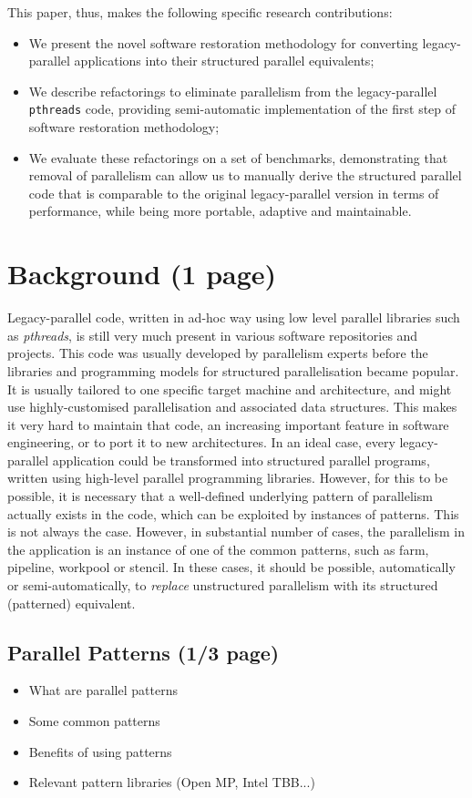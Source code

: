 \documentclass{llncs}
\begin{document}
This paper, thus, makes the following specific research contributions:
\begin{itemize}
    \item We present the novel software restoration methodology for converting legacy-parallel applications into their structured parallel equivalents;
    \item We describe refactorings to eliminate parallelism from the legacy-parallel \lstinline{pthreads} code, providing semi-automatic implementation of the first step of software restoration methodology;
    \item We evaluate these refactorings on a set of benchmarks, demonstrating that removal of parallelism can allow us to manually derive the structured parallel code that is comparable to the original legacy-parallel version in terms of performance, while being more portable, adaptive and maintainable.
\end{itemize}

\section{Background (1 page)}
Legacy-parallel code, written in ad-hoc way using low level parallel libraries such as \emph{pthreads}, is still very much present in various software repositories and projects. This code was usually developed by parallelism experts before the libraries and programming models for structured parallelisation became popular. It is usually tailored to one specific target machine and architecture, and might use highly-customised parallelisation and associated data structures. This makes it very hard to maintain that code, an increasing important feature in software engineering, or to port it to new architectures. In an ideal case, every legacy-parallel application could be transformed into structured parallel programs, written using high-level parallel programming libraries. However, for this to be possible, it is necessary that a well-defined underlying pattern of parallelism actually exists in the code, which can be exploited by instances of patterns. This is not always the case. However, in substantial number of cases, the parallelism in the application is an instance of one of the common patterns, such as farm, pipeline, workpool or stencil. In these cases, it should be possible, automatically or semi-automatically, to \emph{replace} unstructured parallelism with its structured (patterned) equivalent.   

\subsection{Parallel Patterns (1/3 page)}
\begin{itemize}
\item What are parallel patterns
\item Some common patterns
  \item Benefits of using patterns
  \item Relevant pattern libraries (Open MP, Intel TBB...)
\end{itemize}
\end{document}
